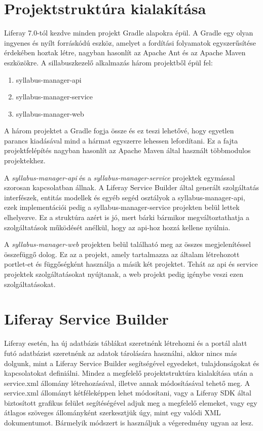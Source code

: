 \documentclass[hidelinks, 12pt, a4paper]{report}
\begin{document}
\section{Projektstruktúra kialakítása}

Liferay 7.0-tól kezdve minden projekt Gradle \cite{gradle} alapokra épül. A Gradle egy olyan ingyenes és nyílt forráskódú eszköz, amelyet a fordítási folyamatok egyszerűsítése érdekében hoztak létre, nagyban hasonlít az Apache Ant \cite{apache-ant} és az Apache Maven \cite{apache-maven} eszközökre. A sillabuszkezelő alkalmazás három projektből épül fel:
\begin{enumerate}
\item syllabus-manager-api
\item syllabus-manager-service
\item syllabus-manager-web
\end{enumerate}
A három projektet a Gradle fogja össze és ez teszi lehetővé, hogy egyetlen parancs kiadásával mind a hármat egyszerre lehessen lefordítani. Ez a fajta projektfelépítés nagyban hasonlít az Apache Maven által használt többmodulos projektekhez.

A \emph{syllabus-manager-api} és a \emph{syllabus-manager-service} projektek egymással szorosan kapcsolatban állnak. A Liferay Service Builder által generált szolgáltatás interfészek, entitás modellek és egyéb segéd osztályok a syllabus-manager-api, ezek implementációi pedig a syllabus-manager-service projekten belül lettek elhelyezve. Ez a struktúra azért is jó, mert bárki bármikor megváltoztathatja a szolgáltatások működését anélkül, hogy az api-hoz hozzá kellene nyúlnia.

A \emph{syllabus-manager-web} projekten belül található meg az összes megjelenítéssel összefüggő dolog. Ez az a projekt, amely tartalmazza az általam létrehozott portlet-et és függőségként használja a másik két projektet. Tehát az api és service projektek szolgáltatásokat nyújtanak, a web projekt pedig igénybe veszi ezen szolgáltatásokat.

\section{Liferay Service Builder}

Liferay esetén, ha új adatbázis táblákat szeretnénk létrehozni és a portál alatt futó adatbázist szeretnénk az adatok tárolására használni, akkor nincs más dolgunk, mint a Liferay Service Builder segítségével egyedeket, tulajdonságokat és kapcsolatokat definiálni. Mindez a megfelelő projektstruktúra kialakítása után a service.xml állomány létrehozásával, illetve annak módosításával tehető meg. A service.xml állományt kétféleképpen lehet módosítani, vagy a Liferay SDK által biztosított grafikus felület segítéségével adjuk meg a megfelelő elemeket, vagy egy átlagos szöveges állományként szerkesztjük úgy, mint egy valódi XML dokumentumot. Bármelyik módszert is használjuk a végeredmény ugyan az lesz.
\end{document}
